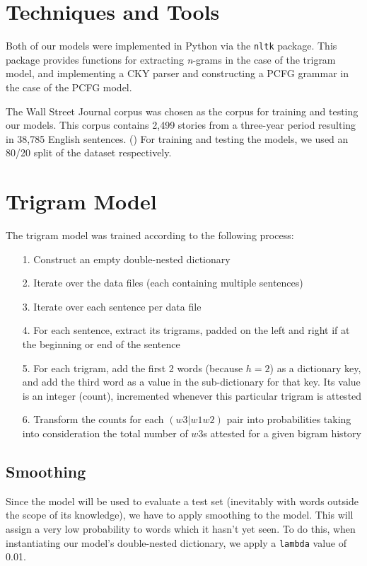 \documentclass{article}
\begin{document}
 
\section{Techniques and Tools}

Both of our models were implemented in Python via the \texttt{nltk} package. This package provides functions for extracting \textit{n}-grams in the case of the trigram model, and implementing a CKY parser and constructing a PCFG grammar in the case of the PCFG model.

The Wall Street Journal corpus was chosen as the corpus for training and testing our models. This corpus contains 2,499 stories from a three-year period resulting in 38,785 English sentences. (\cite{treebank3}) For training and testing the models, we used an 80/20 split of the dataset respectively.

\section{Trigram Model}
The trigram model was trained according to the following process:
\begin{itemize}
    \item [1.] Construct an empty double-nested dictionary
    \item [2.] Iterate over the data files (each containing multiple sentences)
    \item [3.] Iterate over each sentence per data file
    \item [4.] For each sentence, extract its trigrams, padded on the left and right if at the beginning or end of the sentence
    \item [5.] For each trigram, add the first 2 words (because $h=2$) as a dictionary key, and add the third word as a value in the sub-dictionary for that key. Its value is an integer (count), incremented whenever this particular trigram is attested
    \item [6.] Transform the counts for each $(w3 | w1 w2)$ pair into probabilities taking into consideration the total number of $w3$s attested for a given bigram history
\end{itemize}

\subsection{Smoothing}
Since the model will be used to evaluate a test set (inevitably with words outside the scope of its knowledge), we have to apply smoothing to the model. This will assign a very low probability to words which it hasn't yet seen. To do this, when instantiating our model's double-nested dictionary, we apply a \texttt{lambda} value of 0.01.
\end{document}
